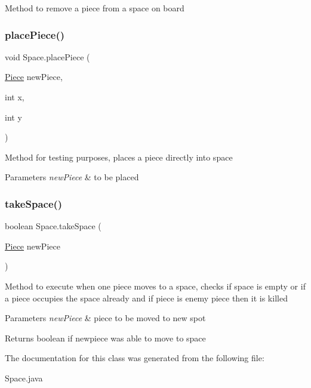 Method to remove a piece from a space on board \mbox{\label{class_space_a3216bbe73ee02cf97a2b4c90ccf88e7f}} 
\subsubsection{\texorpdfstring{placePiece()}{placePiece()}}
{\footnotesize\ttfamily void Space.\+place\+Piece (\begin{DoxyParamCaption}\item[{\mbox{\hyperlink{class_piece}{Piece}}}]{new\+Piece,  }\item[{int}]{x,  }\item[{int}]{y }\end{DoxyParamCaption})\hspace{0.3cm}{\ttfamily [inline]}}

Method for testing purposes, places a piece directly into space 
\begin{DoxyParams}{Parameters}
{\em new\+Piece} & to be placed \\
\hline
\end{DoxyParams}
\mbox{\label{class_space_a7450bdf13ff2dc4dbbe89573d467f579}} 
\subsubsection{\texorpdfstring{takeSpace()}{takeSpace()}}
{\footnotesize\ttfamily boolean Space.\+take\+Space (\begin{DoxyParamCaption}\item[{\mbox{\hyperlink{class_piece}{Piece}}}]{new\+Piece }\end{DoxyParamCaption})\hspace{0.3cm}{\ttfamily [inline]}}

Method to execute when one piece moves to a space, checks if space is empty or if a piece occupies the space already and if piece is enemy piece then it is killed 
\begin{DoxyParams}{Parameters}
{\em new\+Piece} & piece to be moved to new spot \\
\hline
\end{DoxyParams}
\begin{DoxyReturn}{Returns}
boolean if newpiece was able to move to space 
\end{DoxyReturn}


The documentation for this class was generated from the following file\+:\begin{DoxyCompactItemize}
\item 
Space.\+java\end{DoxyCompactItemize}
